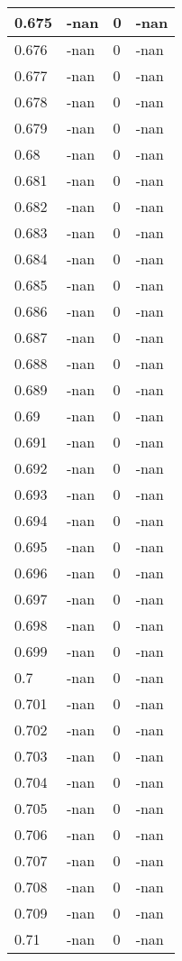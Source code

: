 \documentclass[a4paper,14pt]{extarticle}
\begin{document}
\begin{longtable}{||m{3cm}||m{3cm}|m{3cm}||m{3cm}||}
\hline
0.675 & -nan & 0 & -nan\\
\hline
0.676 & -nan & 0 & -nan\\
\hline
0.677 & -nan & 0 & -nan\\
\hline
0.678 & -nan & 0 & -nan\\
\hline
0.679 & -nan & 0 & -nan\\
\hline
0.68 & -nan & 0 & -nan\\
\hline
0.681 & -nan & 0 & -nan\\
\hline
0.682 & -nan & 0 & -nan\\
\hline
0.683 & -nan & 0 & -nan\\
\hline
0.684 & -nan & 0 & -nan\\
\hline
0.685 & -nan & 0 & -nan\\
\hline
0.686 & -nan & 0 & -nan\\
\hline
0.687 & -nan & 0 & -nan\\
\hline
0.688 & -nan & 0 & -nan\\
\hline
0.689 & -nan & 0 & -nan\\
\hline
0.69 & -nan & 0 & -nan\\
\hline
0.691 & -nan & 0 & -nan\\
\hline
0.692 & -nan & 0 & -nan\\
\hline
0.693 & -nan & 0 & -nan\\
\hline
0.694 & -nan & 0 & -nan\\
\hline
0.695 & -nan & 0 & -nan\\
\hline
0.696 & -nan & 0 & -nan\\
\hline
0.697 & -nan & 0 & -nan\\
\hline
0.698 & -nan & 0 & -nan\\
\hline
0.699 & -nan & 0 & -nan\\
\hline
0.7 & -nan & 0 & -nan\\
\hline
0.701 & -nan & 0 & -nan\\
\hline
0.702 & -nan & 0 & -nan\\
\hline
0.703 & -nan & 0 & -nan\\
\hline
0.704 & -nan & 0 & -nan\\
\hline
0.705 & -nan & 0 & -nan\\
\hline
0.706 & -nan & 0 & -nan\\
\hline
0.707 & -nan & 0 & -nan\\
\hline
0.708 & -nan & 0 & -nan\\
\hline
0.709 & -nan & 0 & -nan\\
\hline
0.71 & -nan & 0 & -nan\\

\end{longtable}
\end{document}
